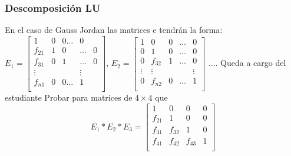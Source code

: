 \documentclass[xcolor=svgnames]{beamer} %
\theoremstyle{plain}
\theoremstyle{definition}
\begin{document}
\begin{frame}
\frametitle{Descomposición LU}
En el caso de Gauss Jordan las matrices e tendrán la forma:
$E_1 = \begin{bmatrix}
1 		&0 & 0 \dots & 0 \\
f_{21} 	&1 & 0 &\dots & 0 \\
f_{31} 	&0 & 1 &\dots & 0 \\
\vdots & & &  \vdots \\
f_{n1} 	&0 & 0 \dots & 1 \\
\end{bmatrix}$, $E_2 = \begin{bmatrix}
1 &0 		& 0 &\dots & 0 \\
0 &1 		& 0 &\dots & 0 \\
0 &f_{32} 	& 1 &\dots & 0 \\
\vdots & \vdots& 	&		&  \vdots \\
0 & f_{n2} & 0 & \dots & 1 \\
\end{bmatrix}$ ....
Queda a cargo del estudiante  Probar para matrices de $4\times4$ que 
$$ E_1*E_2*E_3 = \begin{bmatrix}
1 		& 0 		& 0 		& 0\\
f_{21} 	& 1 		& 0 		& 0\\
f_{31} 	& f_{32}	& 1 		& 0\\
f_{41} 	& f_{42}	& f_{43}	& 1\\
\end{bmatrix}$$

\end{frame}
\end{document}
